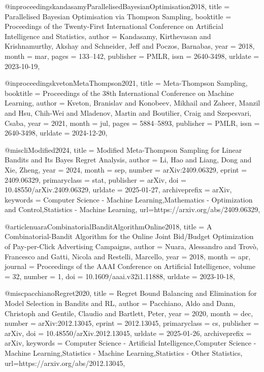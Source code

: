 @inproceedings{kandasamyParallelisedBayesianOptimisation2018,
  title = {Parallelised {{Bayesian Optimisation}} via {{Thompson Sampling}}},
  booktitle = {Proceedings of the {{Twenty-First International Conference}} on {{Artificial Intelligence}} and {{Statistics}}},
  author = {Kandasamy, Kirthevasan and Krishnamurthy, Akshay and Schneider, Jeff and Poczos, Barnabas},
  year = {2018},
  month = mar,
  pages = {133--142},
  publisher = {PMLR},
  issn = {2640-3498},
  urldate = {2023-10-19},
}

@inproceedings{kvetonMetaThompson2021,
  title = {Meta-{{Thompson Sampling}}},
  booktitle = {Proceedings of the 38th {{International Conference}} on {{Machine Learning}}},
  author = {Kveton, Branislav and Konobeev, Mikhail and Zaheer, Manzil and Hsu, Chih-Wei and Mladenov, Martin and Boutilier, Craig and Szepesvari, Csaba},
  year = {2021},
  month = jul,
  pages = {5884--5893},
  publisher = {PMLR},
  issn = {2640-3498},
  urldate = {2024-12-20},
}

@misc{liModified2024,
  title = {Modified {{Meta-Thompson Sampling}} for {{Linear Bandits}} and {{Its Bayes Regret Analysis}}},
  author = {Li, Hao and Liang, Dong and Xie, Zheng},
  year = {2024},
  month = sep,
  number = {arXiv:2409.06329},
  eprint = {2409.06329},
  primaryclass = {stat},
  publisher = {arXiv},
  doi = {10.48550/arXiv.2409.06329},
  urldate = {2025-01-27},
  archiveprefix = {arXiv},
  keywords = {Computer Science - Machine Learning,Mathematics - Optimization and Control,Statistics - Machine Learning},
  url={https://arxiv.org/abs/2409.06329}, 
}

@article{nuaraCombinatorialBanditAlgorithmOnline2018,
  title = {A {{Combinatorial-Bandit Algorithm}} for the {{Online Joint Bid}}/{{Budget Optimization}} of {{Pay-per-Click Advertising Campaigns}}},
  author = {Nuara, Alessandro and Trov{\`o}, Francesco and Gatti, Nicola and Restelli, Marcello},
  year = {2018},
  month = apr,
  journal = {Proceedings of the AAAI Conference on Artificial Intelligence},
  volume = {32},
  number = {1},
  doi = {10.1609/aaai.v32i1.11888},
  urldate = {2023-10-18},
}

@misc{pacchianoRegret2020,
  title = {Regret {{Bound Balancing}} and {{Elimination}} for {{Model Selection}} in {{Bandits}} and {{RL}}},
  author = {Pacchiano, Aldo and Dann, Christoph and Gentile, Claudio and Bartlett, Peter},
  year = {2020},
  month = dec,
  number = {arXiv:2012.13045},
  eprint = {2012.13045},
  primaryclass = {cs},
  publisher = {arXiv},
  doi = {10.48550/arXiv.2012.13045},
  urldate = {2025-01-26},
  archiveprefix = {arXiv},
  keywords = {Computer Science - Artificial Intelligence,Computer Science - Machine Learning,Statistics - Machine Learning,Statistics - Other Statistics},
  url={https://arxiv.org/abs/2012.13045}, 
}


